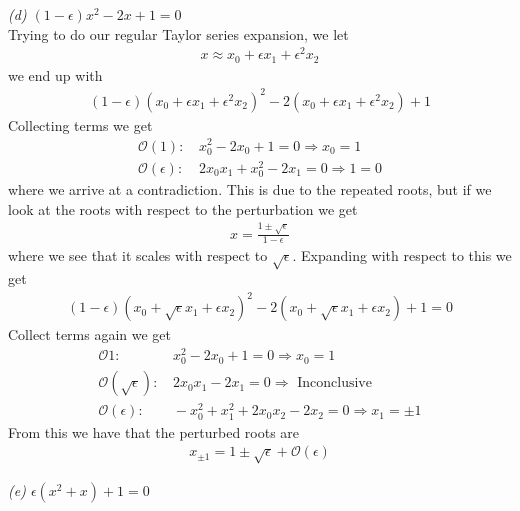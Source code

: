 \documentclass[12pt]{article}
\theoremstyle{remark}
\begin{document}
\textit{(d) $(1 - \epsilon)x^2 - 2x + 1 = 0$} \\ 

Trying to do our regular Taylor series expansion, we let 
\begin{align*}
	x \approx x_0 + \epsilon x_1 + \epsilon^2x_2
\end{align*}
we end up with 
\begin{align*}
	(1-\epsilon)(x_0 + \epsilon x_1 + \epsilon^2x_2)^2 -2(x_0 + \epsilon x_1 + \epsilon^2x_2) + 1
\end{align*}
Collecting terms we get
\begin{align*}
	\mathcal{O}(1): & \, x_0^2 - 2x_0 + 1 = 0 \Rightarrow x_0 = 1 \\
	\mathcal{O}(\epsilon): & \, 2x_0x_1 + x_0^2 - 2x_1 = 0 \Rightarrow 1 = 0 
\end{align*}
where we arrive at a contradiction. This is due to the repeated roots, but if we look at the roots with respect to the perturbation we get
\begin{align*}
	x = \frac{1 \pm \sqrt{\epsilon}}{1 - \epsilon}
\end{align*}
where we see that it scales with respect to $\sqrt{\epsilon}$. Expanding with respect to this we get
\begin{align*}
	(1-\epsilon)(x_0 + \sqrt{\epsilon}x_1 + \epsilon x_2)^2 - 2(x_0 + \sqrt{\epsilon}x_1 + \epsilon x_2) + 1 = 0
\end{align*}
Collect terms again we get
\begin{align*}
	\mathcal{O}{1}: & \, x_0^2 - 2x_0 + 1 = 0 \Rightarrow x_0 = 1 \\
	\mathcal{O}(\sqrt{\epsilon}): & \, 2x_0x_1 - 2x_1 = 0 \Rightarrow \text{ Inconclusive} \\ 
	\mathcal{O}(\epsilon): & \, -x_0^2 + x_1^2 + 2x_0x_2 - 2x_2 = 0 \Rightarrow x_1 = \pm 1
\end{align*}
From this we have that the perturbed roots are 
\begin{align*}
	x_{\pm1} = 1 \pm \sqrt{\epsilon} + \mathcal{O}(\epsilon)
\end{align*}

\newpage 

\textit{(e) $\epsilon(x^2 + x) + 1 = 0$} \\ 
\end{document}

